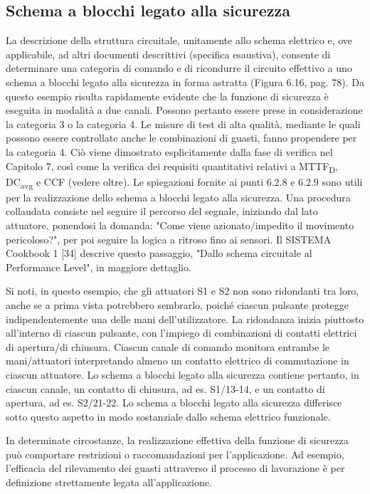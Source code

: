 \subsection{Schema a blocchi legato alla sicurezza}
\label{subsec:06-5-4}
La descrizione della struttura circuitale, unitamente allo schema elettrico e, ove applicabile, ad altri documenti descrittivi (specifica esaustiva), consente di determinare una categoria di comando e di ricondurre il circuito effettivo a uno schema a blocchi legato alla sicurezza in forma astratta (Figura 6.16, pag. 78). Da questo esempio risulta rapidamente evidente che la funzione di sicurezza è eseguita in modalità a due canali. Possono pertanto essere prese in considerazione la categoria 3 o la categoria 4. Le misure di test di alta qualità, mediante le quali possono essere controllate anche le combinazioni di guasti, fanno propendere per la categoria 4. Ciò viene dimostrato esplicitamente dalla fase di verifica nel Capitolo 7, così come la verifica dei requisiti quantitativi relativi a MTTF\textsubscript{D}, DC\textsubscript{avg} e CCF (vedere oltre). Le spiegazioni fornite ai punti 6.2.8 e 6.2.9 sono utili per la realizzazione dello schema a blocchi legato alla sicurezza. Una procedura collaudata consiste nel seguire il percorso del segnale, iniziando dal lato attuatore, ponendosi la domanda: "Come viene azionato/impedito il movimento pericoloso?", per poi seguire la logica a ritroso fino ai sensori. Il SISTEMA Cookbook 1 [34] descrive questo passaggio, "Dallo schema circuitale al Performance Level", in maggiore dettaglio.

Si noti, in questo esempio, che gli attuatori S1 e S2 non sono ridondanti tra loro, anche se a prima vista potrebbero sembrarlo, poiché ciascun pulsante protegge indipendentemente una delle mani dell'utilizzatore. La ridondanza inizia piuttosto all'interno di ciascun pulsante, con l'impiego di combinazioni di contatti elettrici di apertura/di chiusura. Ciascun canale di comando monitora entrambe le mani/attuatori interpretando almeno un contatto elettrico di commutazione in ciascun attuatore. Lo schema a blocchi legato alla sicurezza contiene pertanto, in ciascun canale, un contatto di chiusura, ad es. S1/13-14, e un contatto di apertura, ad es. S2/21-22. Lo schema a blocchi legato alla sicurezza differisce sotto questo aspetto in modo sostanziale dallo schema elettrico funzionale.

In determinate circostanze, la realizzazione effettiva della funzione di sicurezza può comportare restrizioni o raccomandazioni per l'applicazione. Ad esempio, l'efficacia del rilevamento dei guasti attraverso il processo di lavorazione è per definizione strettamente legata all'applicazione.


